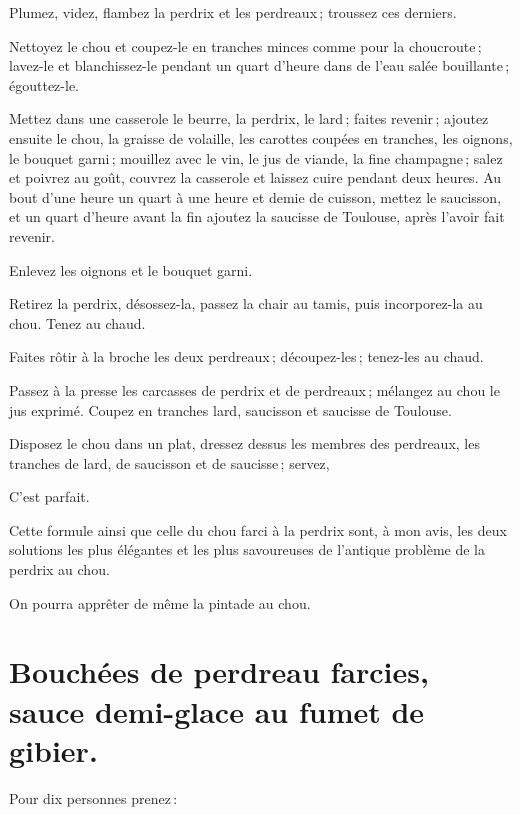 Plumez, videz, flambez la perdrix et les perdreaux ; troussez ces derniers.

Nettoyez le chou et coupez-le en tranches minces comme pour la choucroute ;
lavez-le et blanchissez-le pendant un quart d'heure dans de l’eau salée bouillante ;
égouttez-le.

Mettez dans une casserole le beurre, la perdrix, le lard ; faites revenir ;
ajoutez ensuite le chou, la graisse de volaille, les carottes coupées en
tranches, les oignons, le bouquet garni ; mouillez avec le vin, le jus de
viande, la fine champagne ; salez et poivrez au goût, couvrez la casserole et
laissez cuire pendant deux heures. Au bout d'une heure un quart à une heure et
demie de cuisson, mettez le saucisson, et un quart d'heure avant la fin ajoutez
la saucisse de Toulouse, après l'avoir fait revenir.

Enlevez les oignons et le bouquet garni.

Retirez la perdrix, désossez-la, passez la chair au tamis, puis incorporez-la
au chou. Tenez au chaud.

Faites rôtir à la broche les deux perdreaux ; découpez-les ; tenez-les au
chaud.

Passez à la presse les carcasses de perdrix et de perdreaux ; mélangez au chou
le jus exprimé. Coupez en tranches lard, saucisson et saucisse de Toulouse.

Disposez le chou dans un plat, dressez dessus les membres des perdreaux, les
tranches de lard, de saucisson et de saucisse ; servez,

C'est parfait.

Cette formule ainsi que celle du chou farci à la perdrix sont, à mon avis, les
deux solutions les plus élégantes et les plus savoureuses de l'antique problème
de la perdrix au chou.

\sk

On pourra apprêter de même la pintade au chou.

\section*{\centering Bouchées de perdreau farcies, sauce demi-glace au fumet de gibier.}
{}

Pour dix personnes prenez :

